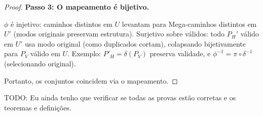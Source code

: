 \documentclass{article}
\begin{document}
\begin{proof}
\textbf{Passo 3: O mapeamento é bijetivo.}

\( \phi \) é injetivo: caminhos distintos em \( U \) levantam para Mega-caminhos distintos em \( U' \) (modos originais preservam estrutura). Surjetivo sobre válidos: todo \( P_H' \) válido em \( U' \) usa modo original (como duplicados cortam), colapsando bijetivamente para \( P_V \) válido em \( U \). Exemplo: \( P'_H = \delta(P_V) \) preserva validade, e \( \phi^{-1} = \pi \circ \delta^{-1} \) (selecionando original).

Portanto, os conjuntos coincidem via o mapeamento.
\end{proof}
\bigskip

TODO: Eu ainda tenho que verificar se todas as provas estão corretas e os teoremas e definições.
\end{document}
